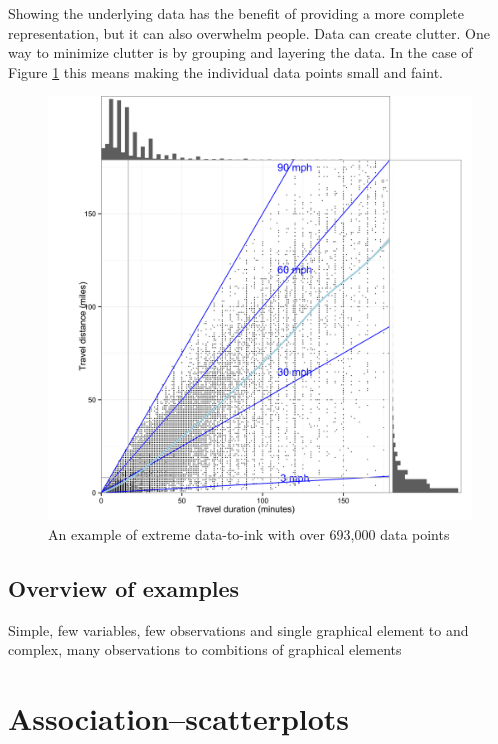 \documentclass[]{krantz}
\begin{document}
Showing the underlying data has the benefit of providing a more complete representation, but it can also overwhelm people. Data can create clutter. One way to minimize clutter is by grouping and layering the data. In the case of Figure \ref{fig:trip-dur} this means making the individual data points small and faint.

\begin{figure}
\includegraphics[width=66.67in]{images/Trip_Dist_Dur} \caption{An example of extreme data-to-ink with over 693,000 data points}\label{fig:trip-dur}
\end{figure}

\hypertarget{overview-of-examples}{%
\section{Overview of examples}\label{overview-of-examples}}

Simple, few variables, few observations and single graphical element to and complex, many observations to combitions of graphical elements

\cleardoublepage

\hypertarget{Association}{%
\chapter{Association--scatterplots}\label{Association}}
\end{document}
